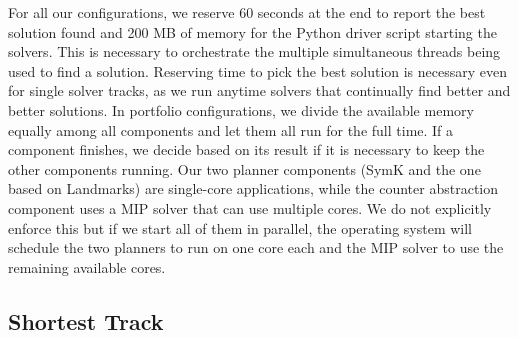 \documentclass{article}
\begin{document}
For all our configurations, we reserve 60 seconds at the end to report the best solution found and 200 MB of memory for the Python driver script starting the solvers. This is necessary to orchestrate the multiple simultaneous threads being used to find a solution. Reserving time to pick the best solution is necessary even for single solver tracks, as we run anytime solvers that continually find better and better solutions. In portfolio configurations, we divide the available memory equally among all components and let them all run for the full time. If a component finishes, we decide based on its result if it is necessary to keep the other components running. Our two planner components (SymK and the one based on Landmarks) are single-core applications, while the counter abstraction component uses a MIP solver that can use multiple cores. We do not explicitly enforce this but if we start all of them in parallel, the operating system will schedule the two planners to run on one core each and the MIP solver to use the remaining available cores.


\subsection{Shortest Track}
\end{document}
